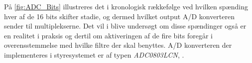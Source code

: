 \noindent
%
På \autoref{fig:ADC_Bits} illustreres det i kronologisk rækkefølge ved hvilken spænding hver af de 16 bits skifter stadie, og dermed hvilket output A/D konverteren sender til multiplekserne. Det vil i   blive undersøgt om disse spændinger også er en realitet i praksis og dertil om aktiveringen af de fire bits foregår i overensstemmelse med hvilke filtre der skal benyttes. A/D konverteren der implementeres i styresystemet er af typen \textit{ADC0803LCN}, \parencite{PDF:ADC}.
